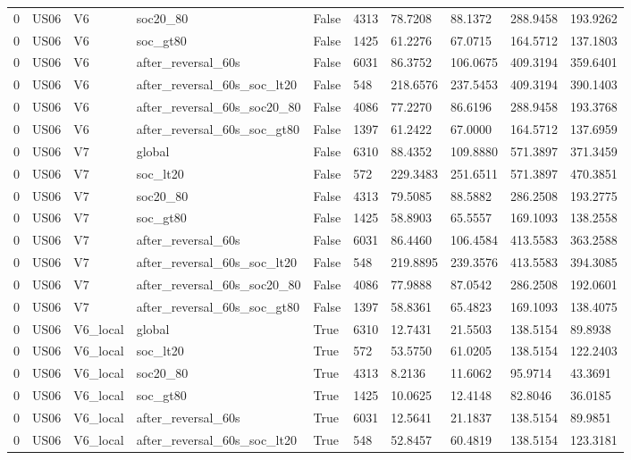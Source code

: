 \begin{tabular}{llllllllll}
0 & US06 & V6 & soc20\_80 & False & 4313 & 78.7208 & 88.1372 & 288.9458 & 193.9262 \\
0 & US06 & V6 & soc\_gt80 & False & 1425 & 61.2276 & 67.0715 & 164.5712 & 137.1803 \\
0 & US06 & V6 & after\_reversal\_60s & False & 6031 & 86.3752 & 106.0675 & 409.3194 & 359.6401 \\
0 & US06 & V6 & after\_reversal\_60s\_soc\_lt20 & False & 548 & 218.6576 & 237.5453 & 409.3194 & 390.1403 \\
0 & US06 & V6 & after\_reversal\_60s\_soc20\_80 & False & 4086 & 77.2270 & 86.6196 & 288.9458 & 193.3768 \\
0 & US06 & V6 & after\_reversal\_60s\_soc\_gt80 & False & 1397 & 61.2422 & 67.0000 & 164.5712 & 137.6959 \\
0 & US06 & V7 & global & False & 6310 & 88.4352 & 109.8880 & 571.3897 & 371.3459 \\
0 & US06 & V7 & soc\_lt20 & False & 572 & 229.3483 & 251.6511 & 571.3897 & 470.3851 \\
0 & US06 & V7 & soc20\_80 & False & 4313 & 79.5085 & 88.5882 & 286.2508 & 193.2775 \\
0 & US06 & V7 & soc\_gt80 & False & 1425 & 58.8903 & 65.5557 & 169.1093 & 138.2558 \\
0 & US06 & V7 & after\_reversal\_60s & False & 6031 & 86.4460 & 106.4584 & 413.5583 & 363.2588 \\
0 & US06 & V7 & after\_reversal\_60s\_soc\_lt20 & False & 548 & 219.8895 & 239.3576 & 413.5583 & 394.3085 \\
0 & US06 & V7 & after\_reversal\_60s\_soc20\_80 & False & 4086 & 77.9888 & 87.0542 & 286.2508 & 192.0601 \\
0 & US06 & V7 & after\_reversal\_60s\_soc\_gt80 & False & 1397 & 58.8361 & 65.4823 & 169.1093 & 138.4075 \\
0 & US06 & V6\_local & global & True & 6310 & 12.7431 & 21.5503 & 138.5154 & 89.8938 \\
0 & US06 & V6\_local & soc\_lt20 & True & 572 & 53.5750 & 61.0205 & 138.5154 & 122.2403 \\
0 & US06 & V6\_local & soc20\_80 & True & 4313 & 8.2136 & 11.6062 & 95.9714 & 43.3691 \\
0 & US06 & V6\_local & soc\_gt80 & True & 1425 & 10.0625 & 12.4148 & 82.8046 & 36.0185 \\
0 & US06 & V6\_local & after\_reversal\_60s & True & 6031 & 12.5641 & 21.1837 & 138.5154 & 89.9851 \\
0 & US06 & V6\_local & after\_reversal\_60s\_soc\_lt20 & True & 548 & 52.8457 & 60.4819 & 138.5154 & 123.3181 \\

\end{tabular}
